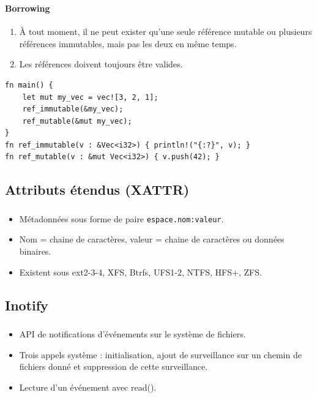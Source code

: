\documentclass[10pt]{beamer}
\begin{document}
\begin{frame}[fragile]
    \frametitle{\subsecname}
    \framesubtitle{Borrowing}
    \begin{enumerate}
        \pause
        \item À tout moment, il ne peut exister qu'une seule référence mutable ou plusieurs 
            références immutables, mais pas les deux en même temps.
        \pause
        \item Les références doivent toujours être valides.
    \end{enumerate}

    \pause

    \begin{verbatim}
fn main() {
    let mut my_vec = vec![3, 2, 1];
    ref_immutable(&my_vec);
    ref_mutable(&mut my_vec);
}
fn ref_immutable(v : &Vec<i32>) { println!("{:?}", v); }
fn ref_mutable(v : &mut Vec<i32>) { v.push(42); }
    \end{verbatim}
\end{frame}

\subsection{Attributs étendus (XATTR)}
\begin{frame}
    \frametitle{\subsecname}
    \begin{itemize}
        \item Métadonnées sous forme de paire \texttt{espace.nom:valeur}.
        \pause
        \item Nom = chaine de caractères, valeur = chaine de caractères ou données binaires.
        \pause
        \item Existent sous ext2-3-4, XFS, Btrfs, UFS1-2, NTFS, HFS+, ZFS.
    \end{itemize}
\end{frame}

\subsection{Inotify}
\begin{frame}
    \frametitle{\subsecname}
    \begin{itemize}
        \item API de notifications d'événements sur le système de fichiers.
        \pause
        \item Trois appels système : initialisation, ajout de surveillance sur un chemin de fichiers 
            donné et suppression de cette surveillance.
        \pause
        \item Lecture d'un événement avec read().
    \end{itemize}
\end{frame}
\end{document}
